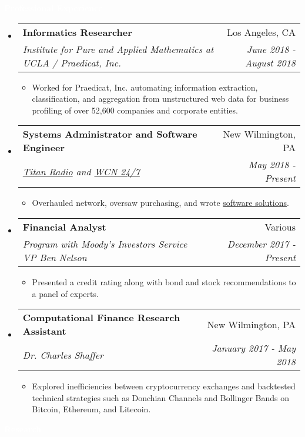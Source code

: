\documentclass[letterpaper,11pt]{article}
\makeatletter
\newcommand{\resitem}[1]{\item #1 \vspace{-2pt}}
\newcommand{\resheading}[1]{{\large \colorbox{electricpurple}{\begin{minipage}{\textwidth}{\textbf{#1 \vphantom{p\^{E}}}}\end{minipage}}}}
\newcommand{\ressubheading}[4]{
	\begin{tabular*}{7.0in}{l@{\extracolsep{\fill}}r}
		\textbf{#1} & #2 \\
		\textit{#3} & \textit{#4} \\
	\end{tabular*}\vspace{-6pt}}
\makeatother
\begin{document}
	\resheading{\textcolor{white}{Professional Experience}}
	\begin{itemize}[topsep=3pt, itemsep=1pt]
		\item
		\ressubheading{Informatics Researcher}{Los Angeles, CA}{Institute for Pure and Applied Mathematics at UCLA / Praedicat, Inc.}{June 2018 -August 2018}
		\begin{itemize}[topsep=3pt, itemsep=1pt]
			\resitem{Worked for Praedicat, Inc. automating information extraction, classification, and aggregation from unstructured web data for business profiling of over 52,600 companies and corporate entities.}
		\end{itemize}
		\item
		\ressubheading{Systems Administrator and Software Engineer}{New Wilmington, PA}{\href{http://titanradio.net/}{Titan Radio} and \href{https://www.wcn247.com/}{WCN 24/7}}{May 2018 - Present}
		\begin{itemize}[topsep=3pt, itemsep=1pt]
			\resitem{Overhauled network, oversaw purchasing, and wrote \href{https://github.com/alexandermichels/WeatherWaves}{software solutions}.}
		\end{itemize}
		\item
		\ressubheading{Financial Analyst}{Various}{Program with Moody’s Investors Service VP Ben Nelson}{December 2017 - Present}
		\begin{itemize}[topsep=3pt, itemsep=1pt]
			\resitem{Presented a credit rating along with bond and stock recommendations to a panel of experts.}
		\end{itemize}
		\item
		\ressubheading{Computational Finance Research Assistant}{New Wilmington, PA}{Dr. Charles Shaffer}{January 2017 - May 2018}
		\begin{itemize}[topsep=3pt, itemsep=1pt]
			\resitem{Explored inefficiencies between cryptocurrency exchanges and backtested technical strategies such as Donchian Channels and Bollinger Bands on Bitcoin, Ethereum, and Litecoin.}
		\end{itemize}
		
	\end{itemize}
	\resheading{\textcolor{white}{Research}}
	
\end{document}

